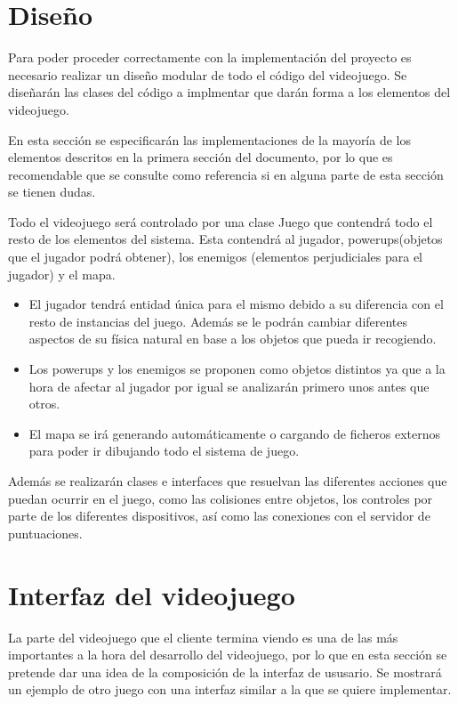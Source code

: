 \documentclass[palatino]{apuntes}
\begin{document}
\begin{itemize}
\section{Diseño}

Para poder proceder correctamente con la implementación del proyecto es necesario realizar un diseño modular de todo el código del videojuego. Se diseñarán las clases del código a implmentar que darán forma a los elementos del videojuego.

En esta sección se especificarán las implementaciones de la mayoría de los elementos descritos en la primera sección del documento, por lo que es recomendable que se consulte como referencia si en alguna parte de esta sección se tienen dudas.

Todo el videojuego será controlado por una clase Juego que contendrá todo el resto de los elementos del sistema. Esta contendrá al jugador, powerups(objetos que el jugador podrá obtener), los enemigos (elementos perjudiciales para el jugador) y el mapa.

\begin{itemize}
	\item El jugador tendrá entidad única para el mismo debido a su diferencia con el resto de instancias del juego. Además se le podrán cambiar diferentes aspectos de su física natural en base a los objetos que pueda ir recogiendo.
	\item Los powerups y los enemigos se proponen como objetos distintos ya que a la hora de afectar al jugador por igual se analizarán primero unos antes que otros.
	\item El mapa se irá generando automáticamente o cargando de ficheros externos para poder ir dibujando todo el sistema de juego.
\end{itemize}

Además se realizarán clases e interfaces que resuelvan las diferentes acciones que puedan ocurrir en el juego, como las colisiones entre objetos, los controles por parte de los diferentes dispositivos, así como las conexiones con el servidor de puntuaciones.


\section{Interfaz del videojuego}
La parte del videojuego que el cliente termina viendo es una de las más importantes a la hora del desarrollo del videojuego, por lo que en esta sección se pretende dar una idea de la composición de la interfaz de ususario. Se mostrará un ejemplo de otro juego con una interfaz similar a la que se quiere implementar.


\end{itemize}
\end{document}
